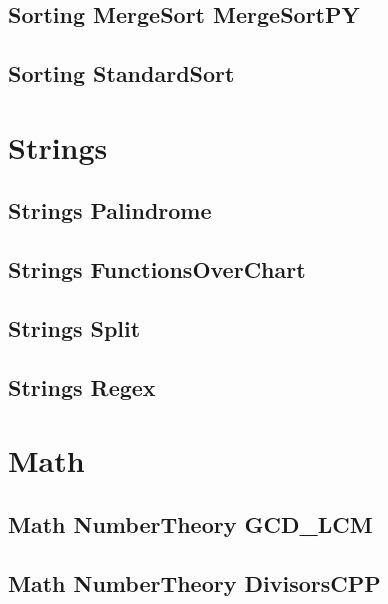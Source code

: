 \subsection{Sorting MergeSort MergeSortPY}
\raggedbottom
\hrulefill
\subsection{Sorting StandardSort}
\raggedbottom
\hrulefill

\section{Strings}
\subsection{Strings Palindrome}
\raggedbottom
\hrulefill
\subsection{Strings FunctionsOverChart}
\raggedbottom
\hrulefill
\subsection{Strings Split}
\raggedbottom
\hrulefill
\subsection{Strings Regex}
\raggedbottom
\hrulefill

\section{Math}
\subsection{Math NumberTheory GCD_LCM}
\raggedbottom
\hrulefill
\subsection{Math NumberTheory DivisorsCPP}
\raggedbottom
\hrulefill
